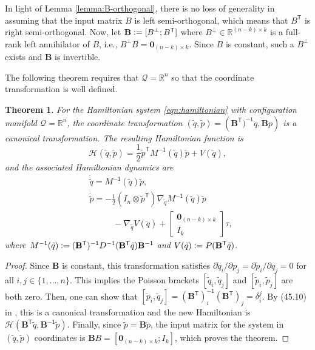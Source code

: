 \documentclass[journal,twoside,web, twocolumn]{ieeecolor}
\newtheorem{thm}{Theorem}%
\newcommand*{\tpose}{^\mathsf{T}}
\newcommand*{\inv}{^\mathsf{-1}}
\newcommand*{\R}{\mathbb{R}}
\newcommand*{\Minv}{M^\mathsf{-1}}
\newcommand*{\Id}[1]{I_{#1}}
\newcommand*{\Zmat}[1]{\bm{0}_{#1}}
\newcommand*{\simpleB}{\begin{bmatrix}\Zmat{(n-k)\times k}\\ \Id{k}\end{bmatrix}}
\newcommand*{\eqdef}{\vcentcolon=}
\begin{document}
In light of Lemma \ref{lemma:B-orthogonal}, there is no loss of generality in
assuming that the input matrix \(B\) is left semi-orthogonal, which means that
\(B\tpose\) is right semi-orthogonal.
Now, let \(\mathbf{B} \eqdef [B^\perp; B\tpose]\) where 
\(B^\perp \in \R^{(n-k)\times k}\) is a full-rank left annihilator of \(B\), i.e.,
\(B^\perp B = \Zmat{(n-k) \times k}\).
Since \(B\) is constant, such a \(B^\perp\) exists and
\(\mathbf{B}\) is invertible.

The following theorem requires that \(\mathcal{Q} = \R^n\) so that the
coordinate transformation is well defined.

\begin{thm}\label{thm:simply-actuated}
For the Hamiltonian system \eqref{eqn:hamiltonian} with configuration manifold \(\mathcal{Q} = \R^n\), the coordinate transformation \((\tilde q,\tilde p) = \left(\mathbf{B}\tpose)\inv q,\mathbf{B}p\right)\) is a canonical transformation. The resulting Hamiltonian function is 
    \begin{equation}
    \label{eqn:simple-hamiltonian}
        \mathcal{H}(\tilde{q},\tilde{p}) = 
        \frac{1}{2} \tilde{p}\tpose \Minv(\tilde{q}) \tilde{p} + V(\tilde{q}),
      \end{equation}
      and the associated Hamiltonian dynamics are
      \begin{equation}
        \label{eq:Hamiltonian_system:simply_actuated}
          \begin{aligned}
            &           \dot{\tilde{q}} = \Minv(\tilde{q})\tilde{p}, \\
            &           \dot{\tilde{p}} = -\frac{1}{2} (\Id{n} \otimes \tilde{p}\tpose)
              \nabla_{\tilde{q}} \Minv(\tilde{q}) \tilde{p} \\
            &          \phantom{---} - \nabla_{\tilde{q}} V(\tilde{q}) + \simpleB \tau,
          \end{aligned}
  \end{equation}
  where 
    \(\Minv(\tilde{q}) \eqdef 
    (\mathbf{B}\tpose)\inv D^{-1}(\mathbf{B}\tpose \tilde{q})\mathbf{B}\inv\)
    and
    \(V(\tilde{q}) \eqdef P(\mathbf{B}\tpose \tilde{q})\).
\end{thm}
\begin{proof}
    Since \(\mathbf{B}\) is constant, this transformation satisfies
    \(\partial\tilde{q}_i/\partial p_j = \partial\tilde{p}_i/\partial q_j = 0\) for all 
    \(i,j \in \{1,\ldots,n\}\).
    This implies the Poisson brackets \([\tilde{q}_i, \tilde{q}_j]\)
    and \([\tilde{p}_i,\tilde{p}_j]\) are both zero.
    Then, one can show that
    \([\tilde{p}_i, \tilde{q}_j] = (\mathbf{B}\tpose)\inv_i (\mathbf{B}\tpose)_j
        = \delta_i^j\).
    By (45.10) in \cite{landau_mechanics}, this is a canonical transformation
    and the new Hamiltonian is
    \(\mathcal{H}(\mathbf{B}\tpose \tilde{q}, \mathbf{B}\inv \tilde{p})\).
    Finally, since \(\dot{\tilde{p}} = \mathbf{B} \dot{p}\), the input
    matrix for the system in \((\tilde{q},\tilde{p})\) coordinates is
    \(\mathbf{B}B = [\Zmat{(n-k)\times k}; \Id{k}]\), which proves the theorem.
\end{proof}
\end{document}
